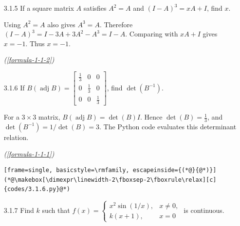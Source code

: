 \begin{enumerate}[label={},leftmargin=1.15cm,labelwidth=1.0cm,labelsep=0.15cm,itemindent=0pt,listparindent=0pt,itemsep=\baselineskip,parsep=0pt,topsep=0pt]
The left matrix has order $3\times1$ and the product has order $3\times3$. Hence $A$ must have one row and three columns: $\boxed{1\times3}$, option \textbf{b)}. The C program checks all four proposed orders against matrix multiplication rules.
\par\noindent\hfill\mbox{\textit{(\ref{formula-1-1-1})}}\par\begin{lstlisting}[frame=single, basicstyle=\rmfamily, escapeinside={(*@}{@*)}]
(*@\makebox[\dimexpr\linewidth-2\fboxsep-2\fboxrule\relax][c]{codes/3.1.4.c}@*)
\end{lstlisting}

\item[3.1.5] If a square matrix $A$ satisfies $A^2=A$ and $(I-A)^3=xA+I$, find $x$.

\vspace{0.6em}\par\solution


Using $A^2=A$ also gives $A^3=A$. Therefore $(I-A)^3=I-3A+3A^2-A^3=I-A$. Comparing with $xA+I$ gives $x=-1$. Thus $\boxed{x=-1}$.\par\noindent\hfill\mbox{\textit{(\ref{formula-1-1-2})}}\par

\item[3.1.6] If $B(\operatorname{adj}B)=\begin{bmatrix}\frac13&0&0\\0&\frac13&0\\0&0&\frac13\end{bmatrix}$, find $\det(B^{-1})$.

\vspace{0.6em}\par\solution


For a $3\times3$ matrix, $B(\operatorname{adj}B)=\det(B)I$. Hence $\det(B)=\frac13$, and $\det(B^{-1})=1/\det(B)=\boxed{3}$. The Python code evaluates this determinant relation.
\par\noindent\hfill\mbox{\textit{(\ref{formula-1-1-1})}}\par\begin{lstlisting}[frame=single, basicstyle=\rmfamily, escapeinside={(*@}{@*)}]
(*@\makebox[\dimexpr\linewidth-2\fboxsep-2\fboxrule\relax][c]{codes/3.1.6.py}@*)
\end{lstlisting}

\item[3.1.7] Find $k$ such that $f(x)=\begin{cases}x^2\sin(1/x),&x\ne0,\\k(x+1),&x=0\end{cases}$ is continuous.


\end{enumerate}
